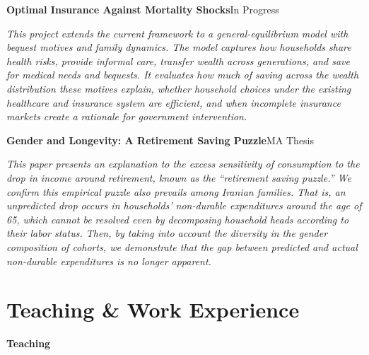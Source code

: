\documentclass[11pt]{article}
\newcommand{\entry}[2]{%
  \textbf{#1}\hfill{#2}\par\vspace{2pt}%
}
\begin{document}
\vspace{1em}

\entry{Optimal Insurance Against Mortality Shocks}{In Progress}
\textit{This project extends the current framework to a general-equilibrium model with bequest motives
and family dynamics. The model captures how households share health risks, provide informal care,
transfer wealth across generations, and save for medical needs and bequests. It evaluates how much of
saving across the wealth distribution these motives explain, whether household choices under the
existing healthcare and insurance system are efficient, and when incomplete insurance markets create
a rationale for government intervention.}

\vspace{1em}

\entry{Gender and Longevity: A Retirement Saving Puzzle}{MA Thesis}
\textit{This paper presents an explanation to the excess sensitivity of consumption to the drop in income
around retirement, known as the ``retirement saving puzzle.'' We confirm this empirical puzzle also
prevails among Iranian families. That is, an unpredicted drop occurs in households' non-durable
expenditures around the age of 65, which cannot be resolved even by decomposing household heads
according to their labor status. Then, by taking into account the diversity in the gender composition
of cohorts, we demonstrate that the gap between predicted and actual non-durable expenditures is no
longer apparent.}

\newpage
\titlespacing{\section}{0pt}{7pt}{4pt}

\section{Teaching \& Work Experience}

\textbf{Teaching}\\[5pt]
\end{document}
